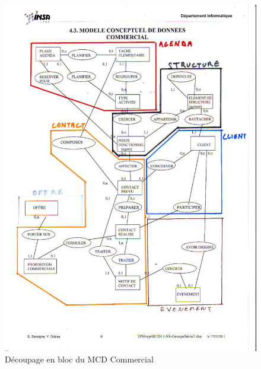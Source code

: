 \begin{figure}[H]
	\begin{center}
		\includegraphics[scale=0.4,clip, trim = 5mm 30mm 3mm 30mm]{Includes/SOA-Blocs-2.pdf}
		\caption{Découpage en bloc du MCD Commercial}
	\end{center}
\end{figure}